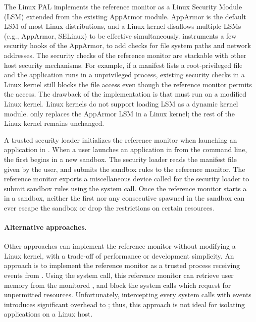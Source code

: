The Linux PAL implements
the reference monitor as a Linux Security Module (LSM) extended from the existing AppArmor module.
AppArmor is the default LSM of most Linux distributions,
and a Linux kernel disallows multiple LSMs (e.g., AppArmor, SELinux) to be effective simultaneously.
\graphene{} instruments
a few security hooks of the AppArmor, to add checks for file system paths
and network addresses.
The security checks of the reference monitor are stackable with other host security mechanisms.
For example, if a manifest lists a root-privileged file and the \graphene{} application runs in a unprivileged process,
existing security checks in a Linux kernel
still blocks the file access even though the reference monitor permits the access.
The drawback of the implementation
is that \graphene{} must run on a modified Linux kernel.
Linux kernels do not support loading LSM as a dynamic kernel module.
\graphene{} only replaces
the AppArmor LSM in a Linux kernel; the rest of the Linux kernel remains unchanged.


A trusted security loader initializes the reference monitor
when launching an application in \graphene{}.
When a user launches an application in \graphene{} from the command line,
the first \picoproc{} begins in a new sandbox.
The security loader
reads the manifest file given by the user,
and submits the sandbox rules to the reference monitor.
The reference monitor exports a miscellaneous device called 
for the security loader to submit sandbox rules using the  system call.
Once the reference monitor
starts a \picoproc{} in a sandbox, neither the first \picoproc{} nor any consecutive \picoprocs{} spawned in the sandbox can ever escape the sandbox or drop the restrictions on certain resources.


\paragraph{Alternative approaches.}
Other approaches can implement the reference monitor without modifying a Linux kernel, with a trade-off of performance or development simplicity.
An approach is to implement the reference monitor as a trusted process receiving  events from \graphene{} \picoprocs{}.
Using the  system call, this reference monitor can retrieve user memory from the monitored \picoprocs{},
and block the system calls which request for unpermitted resources.
Unfortunately, intercepting every system calls with  events introduces significant overhead to \hostapis{};
thus, this approach is not ideal for isolating \graphene{} applications on a Linux host.


